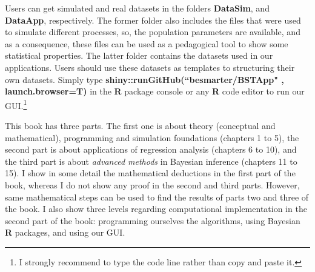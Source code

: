 Users can get simulated and real datasets in the folders \textbf{DataSim}, and \textbf{DataApp}, respectively. The former folder also includes the files that were used to simulate different processes, so, the population parameters are available, and as a consequence, these files can be used as a pedagogical tool to show some statistical properties. The latter folder contains the datasets used in our applications. Users should use these datasets as templates to structuring their own datasets. Simply type \textbf{shiny::runGitHub(``besmarter/BSTApp" , launch.browser=T)} in the \textbf{R} package console or any \textbf{R} code editor to run our GUI.\footnote{I strongly recommend to type the code line rather than copy and paste it.}

This book has three parts. The first one is about theory (conceptual and mathematical), programming and simulation foundations (chapters 1 to 5), the second part is about applications of regression analysis (chapters 6 to 10), and the third part is about \textit{advanced methods} in Bayesian inference (chapters 11 to 15). I show in some detail the mathematical deductions in the first part of the book, whereas I do not show any proof in the second and third parts. However, same mathematical steps can be used to find the results of parts two and three of the book. I also show three levels regarding computational implementation in the second part of the book: programming ourselves the algorithms, using Bayesian \textbf{R} packages, and using our GUI. 

